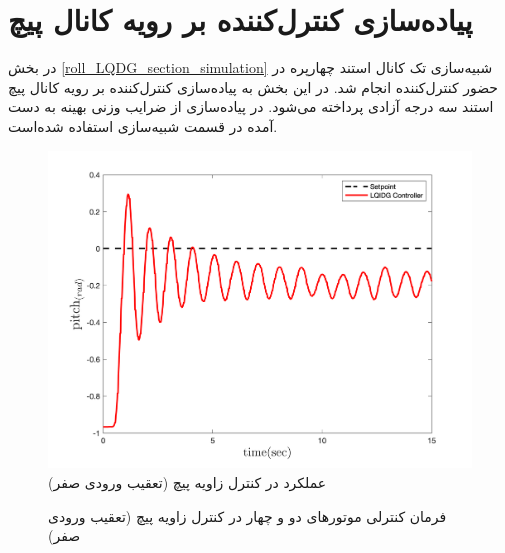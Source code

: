 \section{پیاده‌سازی کنترل‌کننده  بر رویه کانال پیچ}\label{roll_LQDG_section}
در بخش
\ref{roll_LQDG_section_simulation}
شبیه‌سازی تک کانال استند چهارپره در حضور کنترل‌کننده  انجام شد. در این بخش به پیاده‌سازی کنترل‌کننده  بر رویه کانال پیچ استند سه درجه آزادی پرداخته می‌شود.
در پیاده‌سازی از ضرایب وزنی بهینه به دست آمده در قسمت شبیه‌سازی استفاده شده‌است.
\begin{figure}[H]
	\includegraphics[width=.48\linewidth]{../Figures/Calibration/LQDG/Pitch/lqdg_pitch.png}
	\centering
	\caption{عملكرد  در کنترل زاويه پیچ (تعقیب ورودی صفر)}
\end{figure}

\begin{figure}[H]
	\centering
	\caption{‫‪فرمان کنترلی موتورهای دو و چهار در کنترل زاویه پیچ (تعقیب ورودی صفر)}
\end{figure}


